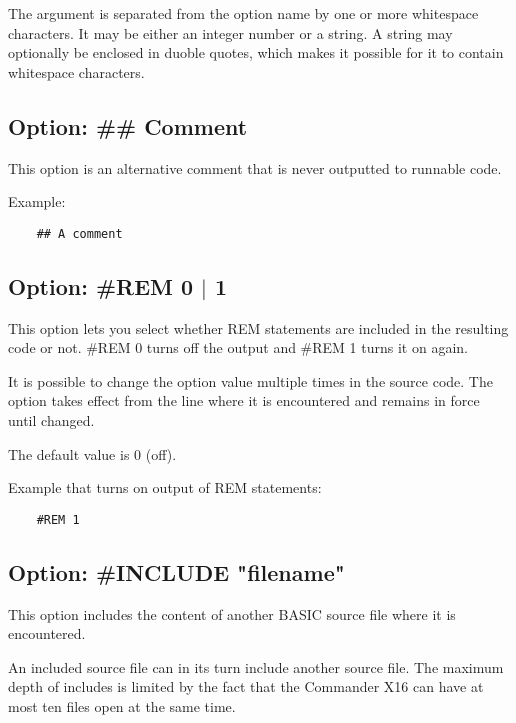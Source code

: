 \documentclass{article}
\begin{document}
        The argument is separated from the option name by one or more whitespace characters. It
        may be either an integer number or a string. A string may optionally be enclosed in
        duoble quotes, which makes it possible for it to contain whitespace characters.

    \subsection{Option: \#\# Comment}

        This option is an alternative comment that is never outputted to runnable
        code.

        Example:

        \begin{verbatim}
    ## A comment
        \end{verbatim}

    \subsection{Option: \#REM 0 $|$ 1}

        This option lets you select whether REM statements are included in
        the resulting code or not. \#REM 0 turns off the output and \#REM 1
        turns it on again.

        It is possible to change the option value multiple times in the
        source code. The option takes effect from the line where it is 
        encountered and remains in force until changed.

        The default value is 0 (off).

        Example that turns on output of REM statements:
        \begin{verbatim}
    #REM 1
        \end{verbatim}

    \subsection{Option: \#INCLUDE "filename"}

        This option includes the content of another BASIC source
        file where it is encountered.

        An included source file can in its turn include another
        source file. The maximum depth of includes is limited
        by the fact that the Commander X16 can have at most
        ten files open at the same time.
\end{document}
